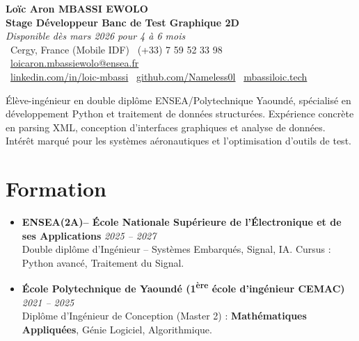 \documentclass[a4paper,11pt]{article}
\begin{document}
\begin{center}
    {\Large \textbf{Loïc Aron MBASSI EWOLO}} \\ \vspace{4pt}
    \textbf{\large Stage Développeur Banc de Test Graphique 2D} \\
    \textit{\small Disponible dès mars 2026 pour 4 à 6 mois} \\ \vspace{4pt}
    \small
    \faMapMarker\ Cergy, France (Mobile IDF) \quad
    \faPhone\ (+33) 7 59 52 33 98 \quad
    \faEnvelope\ \href{mailto:loicaron.mbassiewolo@ensea.fr}{loicaron.mbassiewolo@ensea.fr} \\ \vspace{2pt}
    \faLinkedin\ \href{https://www.linkedin.com/in/loic-mbassi/}{linkedin.com/in/loic-mbassi} \quad
    \faGithub\ \href{https://github.com/Nameless0l}{github.com/Nameless0l} \quad
    \faGlobe\ \href{https://mbassiloic.tech}{mbassiloic.tech}
\end{center}

\vspace{-6pt}

\noindent\small{Élève-ingénieur en double diplôme ENSEA/Polytechnique Yaoundé, spécialisé en développement Python et traitement de données structurées. Expérience concrète en parsing XML, conception d'interfaces graphiques et analyse de données. Intérêt marqué pour les systèmes aéronautiques et l'optimisation d'outils de test.}

\section{Formation}
\begin{itemize}[leftmargin=*, label=\tiny$\bullet$, nosep]
    \item \textbf{ENSEA(2A)-- École Nationale Supérieure de l'Électronique et de ses Applications} \hfill \textit{2025 -- 2027} \\
    \small{Double diplôme d'Ingénieur -- Systèmes Embarqués, Signal, IA. Cursus : Python avancé, Traitement du Signal.}
    \item \textbf{École Polytechnique de Yaoundé (1\textsuperscript{ère} école d'ingénieur CEMAC)} \hfill \textit{2021 -- 2025} \\
    \small{Diplôme d'Ingénieur de Conception (Master 2) : \textbf{Mathématiques Appliquées}, Génie Logiciel, Algorithmique.}
\end{itemize}
\end{document}
